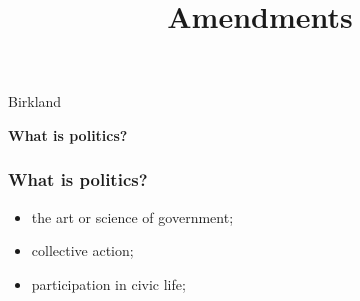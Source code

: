 \documentclass[aspectratio=169]{beamer}
\title{Amendments}
\date{}
\theoremstyle{principle}
\begin{document}


{
  \begin{frame}[plain]
  
\begin{mdframed}[tikzsetting={draw=black,fill=white,fill opacity=0.7,
               line width=0pt},backgroundcolor=none,leftmargin=20,
               rightmargin=20,innertopmargin=4pt]
\Huge Birkland
\end{mdframed}

  \end{frame}
}

%
%
%

\begin{frame}
\begin{center}
\Huge\textbf{What is politics?}
\end{center}
\end{frame}

\begin{frame}
\frametitle{What is politics?}
\begin{itemize}
\item the art or science of government;
\bigskip
\bigskip
\item collective action;
\bigskip
\bigskip
\item participation in civic life;
\end{itemize}

\end{frame}
\end{document}
